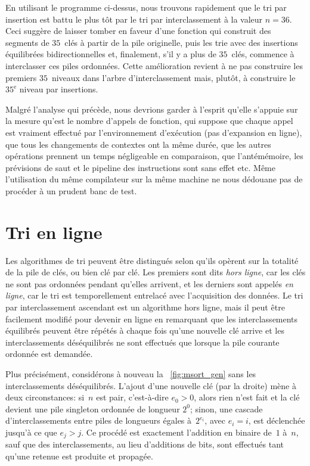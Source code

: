 En utilisant le programme \Erlang ci-dessus, nous trouvons rapidement
que le tri par insertion est battu le plus tôt par le tri par
interclassement à la valeur \(n=36\). Ceci suggère de laisser tomber
 en faveur d'une fonction qui construit des segments de
\(35\)~clés à partir de la pile originelle, puis les trie avec des
insertions équilibrées bidirectionnelles et, finalement, s'il y a plus
de \(35\)~clés, commence à interclasser ces piles ordonnées. Cette
amélioration revient à ne pas construire les premiers \(35\)~niveaux
dans l'arbre d'interclassement
mais, plutôt, à construire le \(35^{\text{e}}\) niveau par insertions.

Malgré l'analyse qui précède, nous devrions garder à l'esprit qu'elle
s'appuie sur la mesure qu'est le nombre d'appels de fonction, qui
suppose que chaque appel est vraiment effectué par l'environnement
d'exécution (pas d'expansion en ligne), que tous les changements de
contextes ont la même durée, que les autres opérations prennent un
temps négligeable en comparaison, que l'antémémoire, les prévisions de
saut et le pipeline des instructions sont sans effet etc. Même
l'utilisation du même compilateur sur la même machine ne nous dédouane
pas de procéder à un prudent banc de test.


\section{Tri en ligne}
\label{sec:online}

Les algorithmes de tri peuvent être distingués selon qu'ils opèrent
sur la totalité de la pile de clés, ou bien clé par clé. Les premiers
sont dits \emph{hors ligne}, car les clés ne sont pas ordonnées
pendant qu'elles arrivent, et les derniers sont appelés \emph{en
  ligne}, car le tri est temporellement entrelacé avec l'acquisition
des données. Le tri par interclassement ascendant est un algorithme
hors ligne, mais il peut être facilement modifié pour devenir en ligne
en remarquant que les interclassements équilibrés peuvent être répétés
à chaque fois qu'une nouvelle clé arrive et les interclassements
déséquilibrés ne sont effectués que lorsque la pile courante ordonnée
est demandée.

Plus précisément, considérons à nouveau la \fig~\ref{fig:msort_gen}
 sans les interclassements
déséquilibrés. L'ajout d'une nouvelle clé (par la droite) mène à deux
circonstances: si~\(n\) est pair, c'est-à-dire \(e_0 > 0\), alors rien
n'est fait et la clé devient une pile singleton ordonnée de longueur
\(2^0\); sinon, une cascade d'interclassements entre piles de
longueurs égales à~\(2^{e_i}\), avec \(e_i=i\), est déclenchée jusqu'à
ce que \(e_j > j\). Ce procédé est exactement l'addition en binaire
de~\(1\) à~\(n\), sauf que des interclassements, au lieu d'additions
de bits, sont effectués tant qu'une retenue est produite et propagée.

